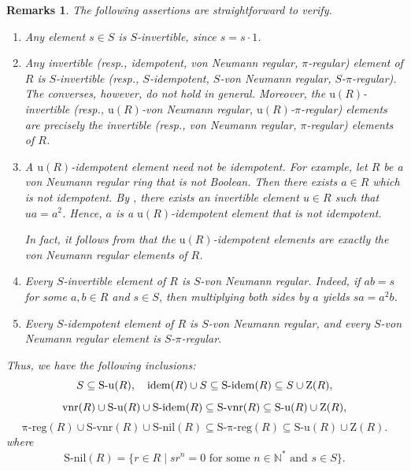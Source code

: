 \documentclass[12pt]{article}
\newtheorem{rems}[thm]{\bf Remarks}
\def\Sidem{\mathrm{S\text{-}idem}}
\def\Snil{\mathrm{S\text{-}nil}}
\def\Su{\mathrm{S\text{-}u}}
\def\Svnr{\mathrm{S\text{-}vnr}}
\def\Spreg{\mathrm{S\text{-}\pi\text{-}reg}}
\def\preg{\mathrm{\pi\text{-}reg}}
\def\Zero{\mathrm{Z}}
\def\u{\mathrm{u}}
\def\idem{{\rm idem}}
\def\vnr{{\rm vnr}}
\begin{document}
\begin{rems}\label{rems-follows-defn} The following assertions are straightforward to verify.
\begin{enumerate}
\item Any element \( s \in S \) is $S$-invertible, since \( s = s \cdot 1 \). 


\item Any invertible (resp., idempotent, von Neumann regular, $\pi$-regular) element of \( R \) is $S$-invertible (resp., $S$-idempotent, $S$-von Neumann regular, $S$-$\pi$-regular). The converses, however, do not hold in general. Moreover, the $\u(R)$-invertible (resp., $\u(R)$-von Neumann regular, $\u(R)$-$\pi$-regular) elements are precisely the invertible (resp., von Neumann regular, $\pi$-regular) elements of \( R \).

\item A $\u(R)$-idempotent element need not be idempotent. For example, let \( R \) be a von Neumann regular ring that is not Boolean. Then there exists \( a \in R \) which is not idempotent. By \cite[Theorem 2.2]{And1}, there exists an invertible element \( u \in R \) such that \( ua = a^2 \). Hence, \( a \) is a $\u(R)$-idempotent element that is not idempotent.

In fact, it follows from \cite[Theorem 2.2]{And1} that the $\u(R)$-idempotent elements are exactly the von Neumann regular elements of \( R \).

\item Every $S$-invertible element of \( R \) is $S$-von Neumann regular. Indeed, if \( ab = s \) for some \( a, b \in R \) and \( s \in S \), then multiplying both sides by \( a \) yields \( sa = a^2 b \).

\item Every $S$-idempotent element of \( R \) is $S$-von Neumann regular, and every $S$-von Neumann regular element is $S$-$\pi$-regular.
\end{enumerate} Thus, we have the following inclusions: \[S \subseteq \Su(R) , \quad 
 \idem(R) \cup S \subseteq \Sidem(R) \subseteq S \cup \Zero(R),
\] \[
\vnr(R)\cup  \Su(R) \cup \Sidem(R) \subseteq \Svnr(R) \subseteq \Su(R) \cup \Zero(R),
\] \[ \preg(R) \cup \Svnr(R) \cup \Snil(R) \subseteq \Spreg(R) \subseteq \Su(R) \cup \Zero(R). \] where 
\[
\Snil(R) = \{ r \in R \mid sr^n = 0 \text{ for some } n \in \mathbb{N}^* \text{ and } s \in S \}.
\]

\end{rems}
\end{document}
